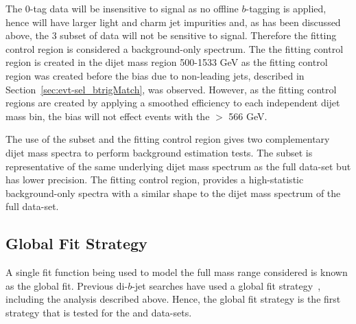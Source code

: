 The 0-tag data will be insensitive to signal as no offline $b$-tagging is applied, hence will have larger light and charm jet impurities
and, as has been discussed above, the  3 \ifb{} subset of data will not be sensitive to signal.
Therefore the fitting control region is considered a background-only spectrum.
The the fitting control region is created in the dijet mass region 500-1533 GeV
as the fitting control region was created before the bias due to non-leading jets, described in Section~\ref{sec:evt-sel_btrigMatch}, was observed.
However, as the fitting control regions are created by applying a smoothed efficiency to each independent dijet mass bin,
the bias will not effect events with the \mjj{} $>$ 566 GeV.

The use of the subset and the fitting control region gives two complementary dijet mass spectra to perform background estimation tests.
The subset is representative of the same underlying dijet mass spectrum as the full \lm{} data-set but has lower precision.
The fitting control region, provides a high-statistic background-only spectra with a similar shape to the dijet mass spectrum of the full \lm{} data-set.




\newpage
\subsection{Global Fit Strategy}
\label{sec:bkg-full_globalFit}

A single fit function being used to model the full mass range considered is known as the global fit.
Previous di-$b$-jet searches have used a global fit strategy~\cite{dibjet-mori16_paper}, including the \summer{} analysis described above.
Hence, the global fit strategy is the first strategy that is tested for the \lm{} and \hm{} data-sets.


